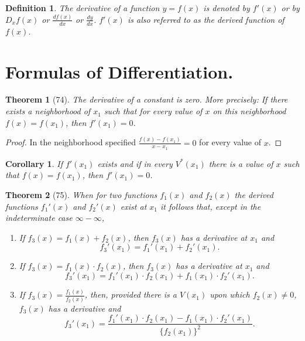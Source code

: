 \documentclass[a4paper,12pt]{book}[2004/02/16]
\providecommand{\hypertarget}[2]{#2}
\theoremstyle{ilemma}
\theoremstyle{itheorem}
\newtheorem{theorem}{Theorem}
\theoremstyle{iother}
\theoremstyle{icorollary}
\newtheorem{corollary}{Corollary}
\theoremstyle{numcorollary}
\theoremstyle{idefinition}
\newtheorem*{definition}{Definition}
\renewcommand{\dfrac}[2]{\frac{#1}{#2}}%
\begin{document}
\begin{definition}
The derivative of a function $y=f(x)$ is denoted by $f'(x)$ or by
$D_xf(x)$ or $\dfrac{df(x)}{dx}$ or $\dfrac{dy}{dx}$. $f'(x)$ is also
referred to as the \emph{derived function} of $f(x)$.
\end{definition}

\section{Formulas of Differentiation.}\hypertarget{chVIIsec2}{}%

\begin{theorem}[74]\hypertarget{thm74}{}
The derivative of a constant is zero. More precisely: If there exists
a neighborhood of $x_1$ such that for every value of $x$ on this
neighborhood $f(x) =f(x_1)$, then $f'(x_1) =0$.
\end{theorem}

\begin{proof}
In the neighborhood specified $\dfrac{f(x)-f(x_1)}{x-x_1}=0$ for every
value of $x$.
\end{proof}

\begin{corollary}
If $f'(x_1)$ exists and if in every $V^*(x_1)$ there is a value of $x$
such that $f(x) =f(x_1)$, then $f'(x_1) = 0$.
\end{corollary}

\begin{theorem}[75]\hypertarget{thm75}{}
When for two functions $f_1(x)$ and $f_2(x)$ the derived functions
$f_1'(x)$ and $f_2'(x)$ exist at $x_1$ it follows that, except in the
indeterminate case $\infty-\infty$,
\begin{enumerate}
\item[\textnormal{(\textit{a})}] If $f_3(x) = f_1(x) + f_2(x)$, then $f_3(x)$ has a
derivative at $x_1$ and
\[
  f_3'(x_1) =f_1'(x_1) + f_2'(x_1).
\]

\item[\textnormal{(\textit{b})}] If $f_3(x) = f_1(x) \cdot f_2(x)$, then $f_3(x)$
has a derivative at $x_1$ and
\[
  f_3'(x_1) = f_1'(x_1) \cdot f_2(x_1) + f_1(x_1) \cdot f_2'(x_1).
\]

\item[\textnormal{(\textit{c})}]If $f_3(x) = \dfrac{f_1(x)}{f_2(x)}$, then,
provided there is a $V(x_1)$ upon which $f_2(x) \neq 0$, $f_3(x)$ has
a derivative and
\[
  f_3'(x_1)
  = \frac{f_1'(x_1) \cdot f_2(x_1)-f_1(x_1) \cdot f_2'(x_1)}
       {\{f_2(x_1)\}^2}.
\]
\end{enumerate}
\end{theorem}
\end{document}
